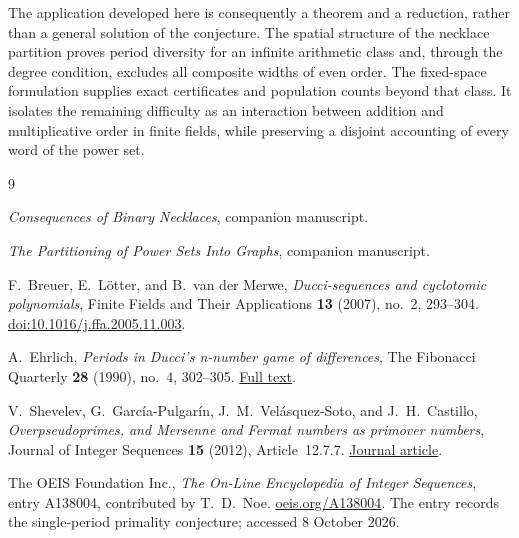 \documentclass[11pt]{article}
\theoremstyle{definition}
\theoremstyle{remark}
\numberwithin{equation}{section}
\begin{document}
The application developed here is consequently a theorem and a reduction,
rather than a general solution of the conjecture. The spatial structure
of the necklace partition proves period diversity for an infinite
arithmetic class and, through the degree condition, excludes all
composite widths of even order. The fixed-space formulation supplies
exact certificates and population counts beyond that class. It isolates
the remaining difficulty as an interaction between addition and
multiplicative order in finite fields, while preserving a disjoint
accounting of every word of the power set.

\begin{thebibliography}{9}

\emph{Consequences of Binary Necklaces}, companion manuscript.

\emph{The Partitioning of Power Sets Into Graphs}, companion manuscript.

F.~Breuer, E.~L\"otter, and B.~van der Merwe,
\emph{Ducci-sequences and cyclotomic polynomials},
Finite Fields and Their Applications \textbf{13} (2007), no.~2,
293--304.
\href{https://doi.org/10.1016/j.ffa.2005.11.003}{doi:10.1016/j.ffa.2005.11.003}.

A.~Ehrlich,
\emph{Periods in Ducci's n-number game of differences},
The Fibonacci Quarterly \textbf{28} (1990), no.~4, 302--305.
\href{https://www.fq.math.ca/Scanned/28-4/ehrlich.pdf}{Full text}.

V.~Shevelev, G.~Garc\'ia-Pulgar\'in, J.~M.~Vel\'asquez-Soto,
and J.~H.~Castillo,
\emph{Overpseudoprimes, and Mersenne and Fermat numbers as primover numbers},
Journal of Integer Sequences \textbf{15} (2012), Article~12.7.7.
\href{https://cs.uwaterloo.ca/journals/JIS/VOL15/Castillo/castillo2.html}
{Journal article}.

The OEIS Foundation Inc.,
\emph{The On-Line Encyclopedia of Integer Sequences}, entry A138004,
contributed by T.~D.~Noe.
\href{https://oeis.org/A138004}{oeis.org/A138004}.
The entry records the single-period primality conjecture; accessed
8 October 2026.

\end{thebibliography}
\end{document}
